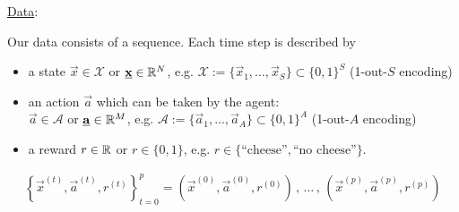 \begin{frame}

\underline{Data}:

Our data consists of a sequence. Each time step is described by 

\begin{itemize}
\item a state $\vec x \in \mathcal{X}$ or $\underline{\mathbf{x}} \in \mathbb{R}^N$, e.g. $\mathcal{X} := \{ \vec x_1, \ldots, \vec x_S\} \subset \{0,1\}^S$ (1-out-$S$ encoding)
\pause
\item an action $\vec a$ which can be taken by the agent:\\

$\vec a \in \mathcal{A}$ or $\underline{\mathbf{a}} \in \mathbb{R}^M$, e.g. $\mathcal{A} := \{ \vec a_1, \ldots, \vec a_A\} \subset \{0,1\}^A$ (1-out-$A$ encoding)
\pause
\item a reward $r \in \mathbb{R}$ or $r \in \{0,1\}$, e.g. $r \in \{\text{``cheese''},\text{``no cheese''}\}$.

\end{itemize}

\pause
{}

\begin{align}
\label{eq:chain}
\left\{\vec x^{(t)}, \vec a^{(t)}, r^{(t)}\right\}_{t=0}^{p} = 
\left( \vec x^{(0)}, \vec a^{(0)}, r^{(0)} \right) \,,\, \ldots \,,\, \left(\vec x^{(p)}, \vec a^{(p)}, r^{(p)} \right)
\end{align}



\end{frame}

